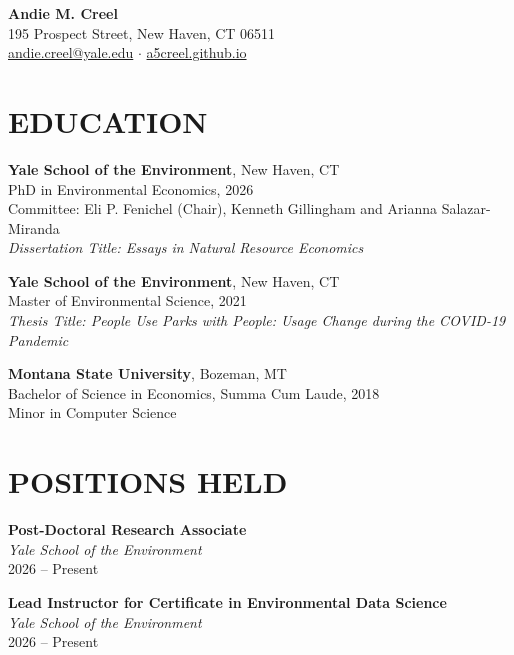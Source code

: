 \documentclass[11pt]{article}
\begin{document}
\begin{center}
    \textbf{\Huge Andie M. Creel} \\
    195 Prospect Street, New Haven, CT 06511 \\
    \href{mailto:andie.creel@yale.edu}{andie.creel@yale.edu} $\cdot$ \href{https://a5creel.github.io}{a5creel.github.io}
\end{center}

\section*{EDUCATION}
\textbf{Yale School of the Environment}, New Haven, CT \\
PhD in Environmental Economics, 2026 \\
Committee: Eli P. Fenichel (Chair), Kenneth Gillingham and Arianna Salazar-Miranda \\
\textit{Dissertation Title: Essays in Natural Resource Economics}

\textbf{Yale School of the Environment}, New Haven, CT \\
Master of Environmental Science, 2021 \\
\textit{Thesis Title: People Use Parks with People: Usage Change during the COVID-19 Pandemic}

\textbf{Montana State University}, Bozeman, MT \\
Bachelor of Science in Economics, Summa Cum Laude, 2018 \\
Minor in Computer Science

\section*{POSITIONS HELD}
\textbf{Post-Doctoral Research Associate}\\
\textit{Yale School of the Environment} \\
2026 -- Present 

\textbf{Lead Instructor for Certificate in Environmental Data Science}\\
\textit{Yale School of the Environment} \\
2026 -- Present 
\end{document}
